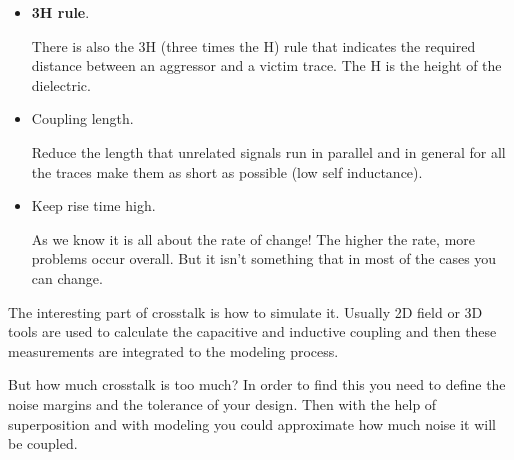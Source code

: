 \documentclass[final]{cubedoc}
\begin{document}
\begin{itemize}
		\item \textbf{3H rule}.
		
		There is also the 3H (three times the H) rule that indicates the required distance between an aggressor and a victim trace. The H is the height of the dielectric.
		
		\item Coupling length.
		
		Reduce the length that unrelated signals run in parallel and in general for all the traces make them as short as possible (low self inductance).
		
		\item Keep rise time high.
		
		As we know it is all about the rate of change! The higher the rate, more problems occur overall. But it isn't something that in most of the cases you can change.
	\end{itemize}
	
	The interesting part of crosstalk is how to simulate it. Usually 2D field or 3D tools are used to calculate the capacitive and inductive coupling and then these measurements are integrated to the modeling process. 
	
	But how much crosstalk is too much? In order to find this you need to define the noise margins and the tolerance of your design. Then with the help of superposition and with modeling you could approximate how much noise it will be coupled.
	
	
	
\end{document}
